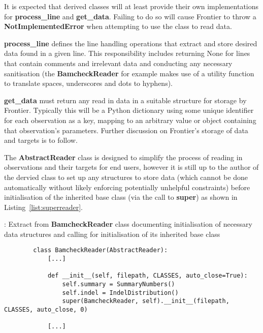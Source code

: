 It is expected that derived classes will at least provide their own
implementations for \textbf{process\_line} and \textbf{get\_data}. Failing to do
so will cause Frontier to throw a \textbf{NotImplementedError} when attempting
to use the class to read data.

\textbf{process\_line} defines the line handling operations that extract and store
desired data found in a given line. This responsibility includes returning None
for lines that contain comments and irrelevant data and conducting any necessary
sanitisation (the \textbf{BamcheckReader} for example makes use of a utility
function to translate spaces, underscores and dots to hyphens).

\textbf{get\_data} must return any read in data in a suitable structure for
storage by Frontier. Typically this will be a Python dictionary using some
unique identifier for each observation as a key, mapping to an arbitrary value
or object containing that observation's parameters. Further discussion on
Frontier's storage of data and targets is to follow.

The \textbf{AbstractReader} class is designed to simplify the process of reading
in observations and their targets for end users, however it is still up to the
author of the dervied class to set up any structures to store data (which cannot
be done automatically without likely enforcing potentially unhelpful
constraints) before initialisation of the inherited base class (via the call to
\textbf{super}) as shown in Listing~\ref{list:superreader}.

\begin{listing}[H]
    \caption[superreader]{: Extract from \textbf{BamcheckReader} class
        documenting initialisation of necessary data structures and calling
        for initialisation of its inherited base class}
    \label{list:superreader}
    \begin{verbatim}
        class BamcheckReader(AbstractReader):
            [...]

            def __init__(self, filepath, CLASSES, auto_close=True):
                self.summary = SummaryNumbers()
                self.indel = IndelDistribution()
                super(BamcheckReader, self).__init__(filepath, CLASSES, auto_close, 0)

            [...]
    \end{verbatim}
\end{listing}

